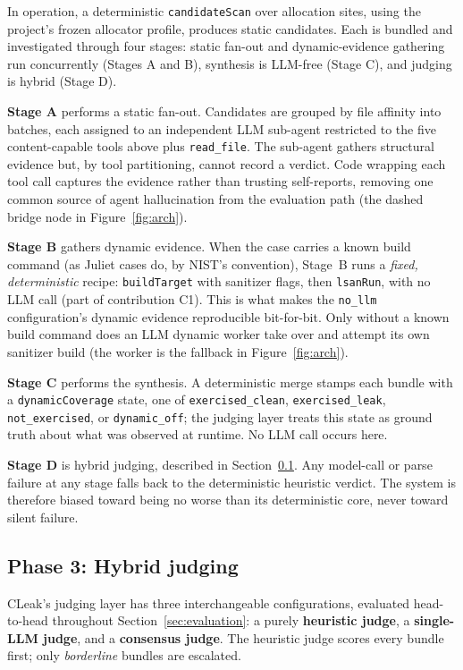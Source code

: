 \documentclass[a4paper]{llncs}
\begin{document}
In operation, a deterministic \texttt{candidateScan} over
allocation sites, using the project's frozen allocator profile,
produces static candidates. Each is
bundled and investigated through four stages: static fan-out and
dynamic-evidence gathering run concurrently (Stages A and B), synthesis
is LLM-free (Stage C), and judging is hybrid (Stage D).

\textbf{Stage A} performs a static fan-out. Candidates are grouped by
file affinity into batches, each assigned to an independent LLM sub-agent
restricted to the five content-capable tools above plus
\texttt{read\_file}. The sub-agent gathers structural evidence but, by
tool partitioning, cannot record a verdict. Code wrapping each tool
call captures the evidence rather than trusting self-reports, removing
one common source of agent hallucination from the
evaluation path (the dashed bridge node in Figure~\ref{fig:arch}).

\textbf{Stage B} gathers dynamic evidence. When the case carries a known
build command (as Juliet cases do, by NIST's convention), Stage~B runs
a \emph{fixed, deterministic} recipe: \texttt{buildTarget} with
sanitizer flags, then \texttt{lsanRun}, with no LLM call (part of
contribution C1). This is what makes the
\texttt{no\_llm} configuration's dynamic evidence reproducible
bit-for-bit. Only without a known build command does an LLM dynamic
worker take over and attempt its own sanitizer build (the worker is the
fallback in Figure~\ref{fig:arch}).

\textbf{Stage C} performs the synthesis. A deterministic merge stamps each bundle
with a \texttt{dynamicCoverage} state, one of
\texttt{exercised\_clean}, \texttt{exercised\_leak}, \texttt{not\_exercised},
or \texttt{dynamic\_off}; the judging layer treats this state as ground truth
about what was observed at runtime. No LLM call occurs here.

\textbf{Stage D} is hybrid judging, described in
Section~\ref{sec:judging}. Any model-call or parse failure at any stage
falls back to the deterministic heuristic verdict. The system is
therefore biased toward being no worse than its deterministic core,
never toward silent failure.

\subsection{Phase 3: Hybrid judging}
\label{sec:judging}

CLeak's judging layer has three interchangeable configurations,
evaluated head-to-head throughout Section~\ref{sec:evaluation}: a
purely \textbf{heuristic judge}, a \textbf{single-LLM judge}, and a
\textbf{consensus judge}. The heuristic judge scores every bundle
first; only \emph{borderline} bundles are escalated.
\end{document}
